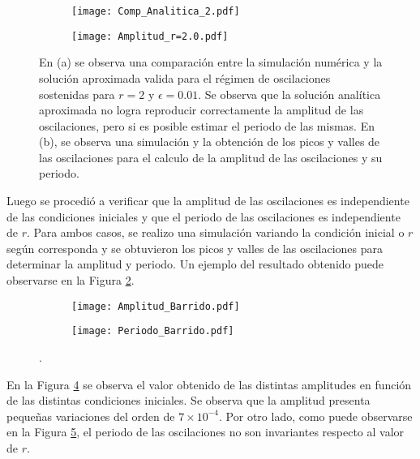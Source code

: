\begin{figure}
    \centering
    \begin{subfigure}[b]{0.48\textwidth}
        \texttt{[image: Comp\_Analitica\_2.pdf]}
        \caption{}
        \label{02_Comp_Analitica}
    \end{subfigure}
    \hfill
    \begin{subfigure}[b]{0.48\textwidth}
        \texttt{[image: Amplitud\_r=2.0.pdf]}
        \caption{}
        \label{02_Picos}
    \end{subfigure}
    \caption{En (a) se observa una comparación entre la simulación numérica y la solución aproximada valida para el régimen de oscilaciones sostenidas para $r=2$ y $\epsilon=0.01$. Se observa que la solución analítica aproximada no logra reproducir correctamente la amplitud de las oscilaciones, pero si es posible estimar el periodo de las mismas. En (b), se observa una simulación y la obtención de los picos y valles de las oscilaciones para el calculo de la amplitud de las oscilaciones y su periodo.}
    \label{02_ejercicio_2}
\end{figure}

Luego se procedió a verificar que la amplitud de las oscilaciones es independiente de las condiciones iniciales y que el periodo de las oscilaciones es independiente de $r$. Para ambos casos, se realizo una simulación variando la condición inicial o $r$ según corresponda y se obtuvieron los picos y valles de las oscilaciones para determinar la amplitud y periodo. Un ejemplo del resultado obtenido puede observarse en la Figura \ref{02_Picos}.

\begin{figure}
    \centering
    \begin{subfigure}[b]{0.48\textwidth}
        \texttt{[image: Amplitud\_Barrido.pdf]}
        \caption{}
        \label{02_Barrido_CI}
    \end{subfigure}
    \hfill
    \begin{subfigure}[b]{0.48\textwidth}
        \texttt{[image: Periodo\_Barrido.pdf]}
        \caption{}
        \label{02_Barrido_r}
    \end{subfigure}
    \caption{.}
    \label{02_Resutados_Barridos}
\end{figure}

En la Figura \ref{02_Barrido_CI} se observa el valor obtenido de las distintas amplitudes en función de las distintas condiciones iniciales. Se observa que la amplitud presenta pequeñas variaciones del orden de $7\times 10^{-4}$. Por otro lado, como puede observarse en la Figura \ref{02_Barrido_r}, el periodo de las oscilaciones no son invariantes respecto al valor de $r$.